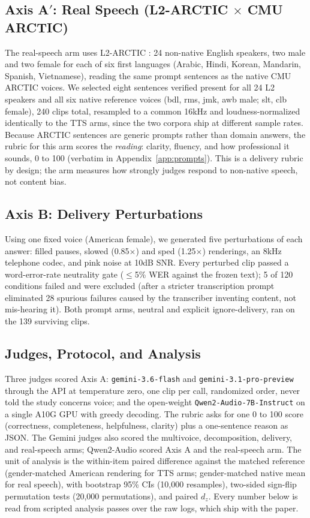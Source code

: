 \subsection{Axis A$'$: Real Speech (L2-ARCTIC $\times$ CMU ARCTIC)}
\label{sec:method-realspeech}

The real-speech arm uses L2-ARCTIC \citep{zhao2018l2arctic}: 24 non-native
English speakers, two male and two female for each of six first languages
(Arabic, Hindi, Korean, Mandarin, Spanish, Vietnamese), reading the same
prompt sentences as the native CMU ARCTIC voices. We selected eight
sentences verified present for all 24 L2 speakers and all six native
reference voices (bdl, rms, jmk, awb male; slt, clb female), 240 clips
total, resampled to a common 16kHz and loudness-normalized identically to
the TTS arms, since the two corpora ship at different sample rates. Because
ARCTIC sentences are generic prompts rather than domain answers, the rubric
for this arm scores the \emph{reading}: clarity, fluency, and how
professional it sounds, 0 to 100 (verbatim in
Appendix~\ref{app:prompts}). This is a delivery rubric by design; the arm
measures how strongly judges respond to non-native speech, not content bias.

\subsection{Axis B: Delivery Perturbations}

Using one fixed voice (American female), we generated five perturbations of
each answer: filled pauses, slowed (0.85$\times$) and sped (1.25$\times$)
renderings, an 8kHz telephone codec, and pink noise at 10dB SNR. Every
perturbed clip passed a word-error-rate neutrality gate ($\le$5\% WER
against the frozen text); 5 of 120 conditions failed and were excluded
(after a stricter transcription prompt eliminated 28 spurious failures
caused by the transcriber inventing content, not mis-hearing it). Both
prompt arms, neutral and explicit ignore-delivery, ran on the 139 surviving
clips.

\subsection{Judges, Protocol, and Analysis}

Three judges scored Axis A: \texttt{gemini-3.6-flash} and
\texttt{gemini-3.1-pro-preview} through the API at temperature zero, one
clip per call, randomized order, never told the study concerns voice; and
the open-weight \texttt{Qwen2-Audio-7B-Instruct} on a single A10G GPU with
greedy decoding. The rubric asks for one 0 to 100 score (correctness,
completeness, helpfulness, clarity) plus a one-sentence reason as JSON. The
Gemini judges also scored the multivoice, decomposition, delivery, and
real-speech arms; Qwen2-Audio scored Axis A and the real-speech arm. The
unit of analysis is the within-item paired difference against the matched
reference (gender-matched American rendering for TTS arms; gender-matched
native mean for real speech), with bootstrap 95\% CIs (10{,}000 resamples),
two-sided sign-flip permutation tests (20{,}000 permutations), and paired
$d_z$. Every number below is read from scripted analysis passes over the raw
logs, which ship with the paper.

